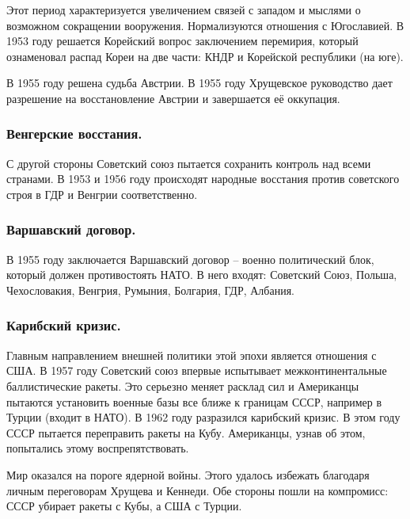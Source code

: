 Этот период характеризуется увеличением связей с западом и мыслями о возможном сокращении вооружения. Нормализуются отношения с Югославией. В 1953 году решается Корейский вопрос заключением перемирия, который ознаменовал распад Кореи на две части: КНДР и Корейской республики (на юге).

В 1955 году решена судьба Австрии. В 1955 году Хрущевское руководство дает разрешение на восстановление Австрии и завершается её оккупация.

\subsubsection{\textbf{Венгерские восстания.}}

С другой стороны Советский союз пытается сохранить контроль над всеми странами. В 1953 и 1956 году происходят народные восстания против советского строя в ГДР и Венгрии соответственно. 

\subsubsection{\textbf{Варшавский договор.}}

В 1955 году заключается Варшавский договор – военно политический блок, который должен противостоять НАТО. В него входят: Советский Союз, Польша, Чехословакия, Венгрия, Румыния, Болгария, ГДР, Албания.

\subsubsection{\textbf{Карибский кризис.}}

Главным направлением внешней политики этой эпохи является отношения с США. В 1957 году Советский союз впервые испытывает межконтинентальные баллистические ракеты. Это серьезно меняет расклад сил и Американцы пытаются установить военные базы все ближе к границам СССР, например в Турции (входит в НАТО). В 1962 году разразился карибский кризис. В этом году СССР пытается переправить ракеты на Кубу. Американцы, узнав об этом, попытались этому воспрепятствовать. 

Мир оказался на пороге ядерной войны. Этого удалось избежать благодаря личным переговорам Хрущева и Кеннеди. Обе стороны пошли на компромисс: СССР убирает ракеты с Кубы, а США с Турции. 